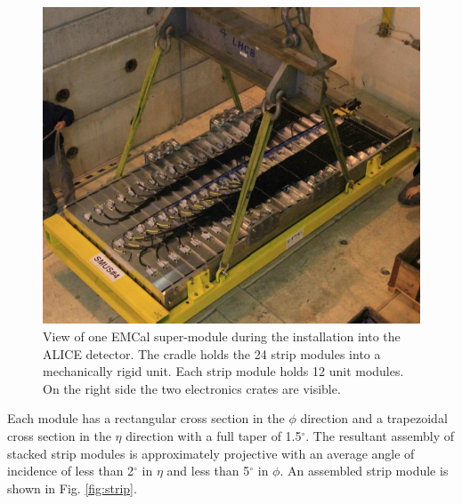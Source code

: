 \begin{figure}[ht]
\begin{center}
\includegraphics[width=1.0\textwidth]{figures/emc-sm.jpg}
\end{center}
\caption{\label{fig:emc-sm} View of one EMCal super-module during the installation into the ALICE detector. The cradle holds the 24 strip modules into a mechanically rigid unit.
Each strip module holds 12 unit modules. On the right side the two electronics crates are visible. }
\end{figure}

Each module has a rectangular cross section in the $\phi$ direction and a trapezoidal cross section in the $\eta$ direction with a full taper of 1.5$^\circ$. 
The resultant assembly of stacked strip modules is approximately projective with an average angle of incidence of less than 2$^\circ$ in $\eta$ and 
less than 5$^\circ$ in $\phi$. An assembled strip module is shown in Fig. \ref{fig:strip}.

